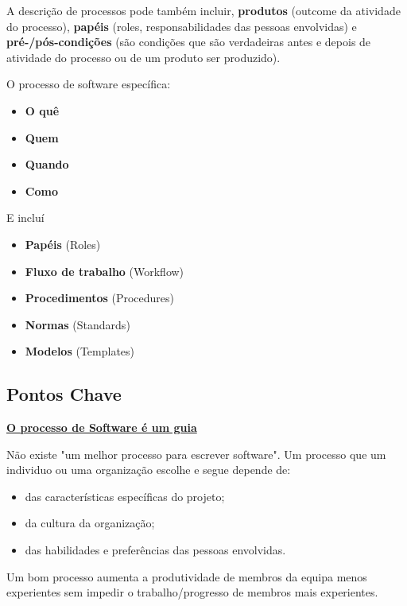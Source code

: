 \documentclass{article}
\begin{document}
A descrição de processos pode também incluir, \textbf{produtos} (outcome da
atividade do processo), \textbf{papéis} (roles, responsabilidades das pessoas envolvidas)
e \textbf{pré-/pós-condições} (são condições que são verdadeiras antes
e depois de atividade do processo ou de um produto ser produzido).

\pagebreak

O processo de software específica:
\begin{itemize}
  \item \textbf{O quê}
  \item \textbf{Quem}
  \item \textbf{Quando}
  \item \textbf{Como}
\end{itemize}

E incluí
\begin{itemize}
  \item \textbf{Papéis} (Roles)
  \item \textbf{Fluxo de trabalho} (Workflow)
  \item \textbf{Procedimentos} (Procedures)
  \item \textbf{Normas} (Standards)
  \item \textbf{Modelos} (Templates)
\end{itemize}

\subsection{Pontos Chave}

\textbf{\uline{O processo de Software é um guia}}

\vspace{2mm}

Não existe "um melhor processo para escrever software".
Um processo que um individuo ou uma organização escolhe e segue depende de:
\begin{itemize}
  \item das características específicas do projeto;
  \item da cultura da organização;
  \item das habilidades e preferências das pessoas envolvidas.
\end{itemize}

\vspace{2mm}

Um bom processo aumenta a produtividade de membros da equipa
menos experientes sem impedir o trabalho/progresso de membros
mais experientes.
\end{document}
